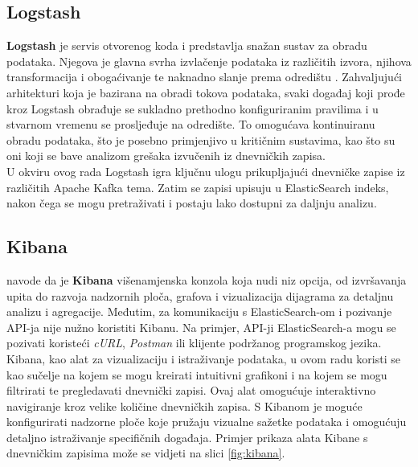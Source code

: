 \documentclass[times, utf8, diplomski]{fer}
\begin{document}
\subsection{Logstash}
\label{sec:logstash}

\textbf{Logstash} je servis otvorenog koda i predstavlja snažan sustav za obradu podataka. Njegova je glavna svrha izvlačenje podataka iz različitih izvora, njihova transformacija i obogaćivanje te naknadno slanje prema odredištu \citep{konda_elasticsearch_2023}. Zahvaljujući arhitekturi koja je bazirana na obradi tokova podataka, svaki događaj koji prođe kroz Logstash obrađuje se sukladno prethodno konfiguriranim pravilima i u stvarnom vremenu se prosljeđuje na odredište. To omogućava kontinuiranu obradu podataka, što je posebno primjenjivo u kritičnim sustavima, kao što su oni koji se bave analizom grešaka izvučenih iz dnevničkih zapisa.\\

U okviru ovog rada Logstash igra ključnu ulogu prikupljajući dnevničke zapise iz različitih Apache Kafka tema. Zatim se zapisi upisuju u ElasticSearch indeks, nakon čega se mogu pretraživati i postaju lako dostupni za daljnju analizu.

\subsection{Kibana}
\label{sec:kibana}

\citet{gormley_elasticsearch_2015} navode da je \textbf{Kibana} višenamjenska konzola koja nudi niz opcija, od izvršavanja upita do razvoja nadzornih ploča, grafova i vizualizacija dijagrama za detaljnu analizu i agregacije. Međutim, za komunikaciju s ElasticSearch-om i pozivanje API-ja nije nužno koristiti Kibanu. Na primjer, API-ji ElasticSearch-a mogu se pozivati koristeći \emph{cURL}, \emph{Postman} ili klijente podržanog programskog jezika.\\

Kibana, kao alat za vizualizaciju i istraživanje podataka, u ovom radu koristi se kao sučelje na kojem se mogu kreirati intuitivni grafikoni i na kojem se mogu filtrirati te pregledavati dnevnički zapisi. Ovaj alat omogućuje interaktivno navigiranje kroz velike količine dnevničkih zapisa. S Kibanom je moguće konfigurirati nadzorne ploče koje pružaju vizualne sažetke podataka i omogućuju detaljno istraživanje specifičnih događaja. Primjer prikaza alata Kibane s dnevničkim zapisima može se vidjeti na slici \ref{fig:kibana}.\\
\end{document}
